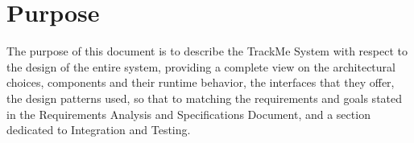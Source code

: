 \section{Purpose}
The purpose of this document is to describe the TrackMe System with respect to the design
of the entire system, providing a complete view on the architectural choices, components and their runtime behavior, the interfaces that they offer, the design patterns used, so that to matching the requirements and goals stated in the Requirements Analysis and Specifications Document, and  a section dedicated to Integration and Testing.

